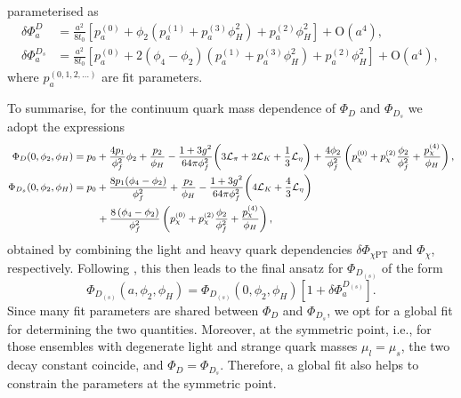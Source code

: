 parameterised as 
\begin{equation}
	\begin{split}
		\delta \Phi_{a}^{D} &= \frac{a^2}{8t_0} \left[ p_a^{(0)} +  \phi_2 \left( p_a^{(1)} + p_a^{(3)} \phi_H^2 \right) +  p_a^{(2)} \phi_H^2   \right] + {\mathrm{O}}(a^4)
		,
		\\
		\delta \Phi_{a}^{D_s} &= \frac{a^2}{8t_0} \left[ p_a^{(0)} + 2 \left( \phi_4 - \phi_2 \right) \left( p_a^{(1)} + p_a^{(3)} \phi_H^2 \right) +  p_a^{(2)} \phi_H^2   \right]  + {\mathrm{O}}(a^4),
		\, \label{eq:phias}
	\end{split}
\end{equation}
where $p_a^{(0,1,2,\dots)}$ are fit parameters. 

To summarise, for the continuum quark mass dependence  of $\Phi_D$ and $\Phi_{D_s}$
we adopt the expressions
\begin{equation}\small
	\begin{split}
		\Phi_D(0,\phi_2, \phi_H)  &= p_0 + \frac{4p_1}{\phi_f^2}\phi_2 + \frac{p_2}{\phi_H}
		-\frac{1+3g^2}{64\pi\phi_f^2}\bigg(
		3\mathcal{L}_\pi + 2 \mathcal{L}_K + \frac{1}{3}\mathcal{L}_\eta  
		\bigg) +
		\frac{4  \phi_2 }{\phi_f^2} \left( p_\chi^{(0)} +  p_\chi^{(2)} \frac{\phi_2}{\phi_f^2} + \frac{p_\chi^{(4)}}{\phi_H} \right),
		\\
		\Phi_{D_s}(0,\phi_2, \phi_H)  &= p_0 + \frac{8p_1(\phi_4-\phi_2)}{\phi_f^2} + \frac{p_2}{\phi_H}
		-\frac{1+3g^2}{64\pi\phi_f^2}\bigg(
		4 \mathcal{L}_K + \frac{4}{3}\mathcal{L}_\eta\bigg)\\
		&\qquad~
	+\frac{8 \left( \phi_4 - \phi_2 \right)} {\phi_f^2} \left( p_\chi^{(0)} +  p_\chi^{(2)} \frac{\phi_2}{\phi_f^2} + \frac{p_\chi^{(4)}}{\phi_H} \right),
	\end{split}
\end{equation}\normalsize
obtained by combining the light and heavy quark dependencies $\delta\Phi_{\chi \mathrm{PT}}$ and $\Phi_\chi$, 
respectively.  
Following , this then leads to the final ansatz for $\Phi_{D_{(s)}}$
of the form
\begin{equation}
	\Phi_{D_{(s)}}(a,\phi_2, \phi_H) = 
	\Phi_{D_{(s)}}(0,\phi_2, \phi_H) \left[ 1   + \delta\Phi_a^{D_{(s)}}\right].
	\label{eq:fds_combined_fit}
\end{equation}
Since many fit parameters are shared between $\Phi_D$ and $\Phi_{D_s}$, we opt for a global fit for 
determining the two quantities. Moreover, at the symmetric point, i.e.,  for those ensembles with 
degenerate light and strange quark masses $\mu_l=\mu_s$, the two decay constant coincide, and
 $\Phi_D=\Phi_{D_s}$. Therefore, a global fit also helps to constrain the parameters at the symmetric 
 point.

